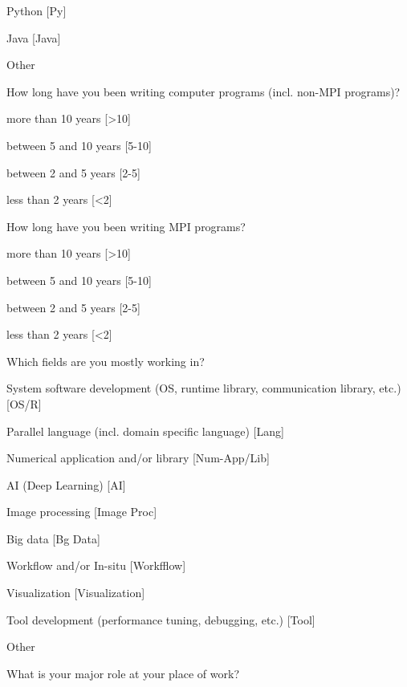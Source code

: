\documentclass[preprint,5p,times]{elsarticle}
\begin{document}
{{\begin{description}
\begin{inparaenum}[{\bf C}1)]
    \item Python [Py]
    \item Java [Java]
    \item Other
    \end{inparaenum}
  \item[Q5:] How long have you been writing computer programs (incl. non-MPI programs)?
    \begin{inparaenum}[{\bf C}1)]
    \item more than 10 years [\textgreater10]
    \item between 5 and 10 years [5-10]
    \item between 2 and 5 years [2-5]
    \item less than 2 years [\textless 2]
    \end{inparaenum}
  \item[Q6:] How long have you been writing MPI programs?
    \begin{inparaenum}[{\bf C}1)]
    \item more than 10 years [\textgreater10]
    \item between 5 and 10 years [5-10]
    \item between 2 and 5 years [2-5]
    \item less than 2 years [\textless 2]
    \end{inparaenum}
  \item[Q7*:] Which fields are you mostly working in?
    \begin{inparaenum}[{\bf C}1)]
    \item System software development (OS, runtime library, communication
      library, etc.) [OS/R]
    \item Parallel language (incl. domain specific language) [Lang]
    \item Numerical application and/or library [Num-App/Lib]
    \item AI (Deep Learning) [AI]
    \item Image processing [Image Proc]
    \item Big data [Bg Data]
    \item Workflow and/or In-situ [Workfflow]
    \item Visualization [Visualization]
    \item Tool development (performance tuning, debugging, etc.) [Tool]
    \item Other
    \end{inparaenum}
  \item[Q8*:] What is your major role at your place of work?

\end{description}}}
\end{document}
